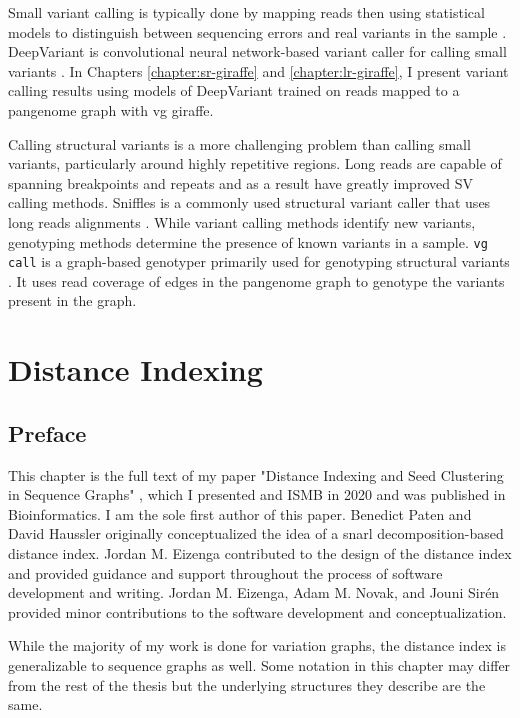 \documentclass[11pt]{ucscthesis}
\begin{document}
Small variant calling is typically done by mapping reads then using statistical models to distinguish between sequencing errors and real variants in the sample \cite{bonfiglio_calling_2024}.
DeepVariant is convolutional neural network-based variant caller for calling small variants \cite{deep_variant_2018}. 
In Chapters \ref{chapter:sr-giraffe} and \ref{chapter:lr-giraffe}, I present variant calling results using models of DeepVariant trained on reads mapped to a pangenome graph with vg giraffe.

Calling structural variants is a more challenging problem than calling small variants, particularly around highly repetitive regions.
Long reads are capable of spanning breakpoints and repeats and as a result have greatly improved SV calling methods.
Sniffles is a commonly used structural variant caller that uses long reads alignments \cite{smolka_sniffles2_2024}.
While variant calling methods identify new variants, genotyping methods determine the presence of known variants in a sample.
\texttt{vg call} is a graph-based genotyper primarily used for genotyping structural variants \cite{hickey_vgsv_2020}.
It uses read coverage of edges in the pangenome graph to genotype the variants present in the graph.


\chapter{Distance Indexing}
\label{chapter:distance}

\section{Preface}
This chapter is the full text of my paper "Distance Indexing and Seed Clustering in Sequence Graphs" \cite{chang_distance_2020}, which I presented and ISMB in 2020 and was published in Bioinformatics.
I am the sole first author of this paper. 
Benedict Paten and David Haussler originally conceptualized the idea of a snarl decomposition-based distance index.
Jordan M. Eizenga contributed to the design of the distance index and provided guidance and support throughout the process of software development and writing.
Jordan M. Eizenga, Adam M. Novak, and Jouni Sirén provided minor contributions to the software development and conceptualization. 

While the majority of my work is done for variation graphs, the distance index is generalizable to sequence graphs as well.
Some notation in this chapter may differ from the rest of the thesis but the underlying structures they describe are the same.
\end{document}
